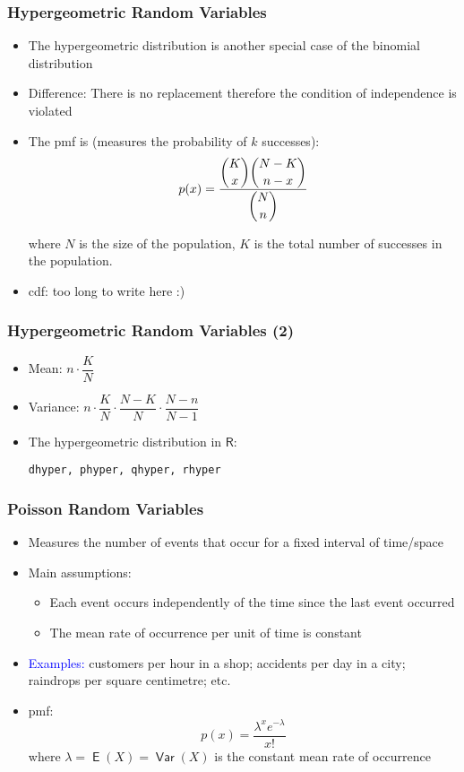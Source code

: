 \documentclass[10pt]{beamer}
\DeclareMathOperator{\E}{\mathsf{E}}
\DeclareMathOperator{\var}{\mathsf{Var}}
\theoremstyle{definition}
\begin{document}
\begin{frame}[fragile]
\frametitle{Hypergeometric Random Variables}
\begin{itemize}
	\item The hypergeometric distribution is another special case of the binomial distribution
		
	\item Difference: There is no replacement therefore the condition of independence is violated
		
	\item The pmf is (measures the probability of $ k $ successes):
	\[
		p(x) = \displaystyle\frac{\dbinom{K}{x}\dbinom{N-K}{n-x}}{\dbinom{N}{n}}
	\]
	
	where $N$ is the size of the population, $K$ is the total number of successes in the population.
	
	\item cdf: too long to write here :)
	\end{itemize}
\end{frame}

\begin{frame}[fragile]
\frametitle{Hypergeometric Random Variables (2)}
\begin{itemize}
	\item Mean: $ n\cdot\dfrac{K}{N} $
		
	\item Variance: $ n\cdot\dfrac{K}{N} \cdot \dfrac{N-K}{N}\cdot \dfrac{N - n}{N - 1}$
		
	\item The hypergeometric distribution in $\mathsf{R}$:
	\begin{lstlisting}[style = rstyle, breaklines]
	dhyper, phyper, qhyper, rhyper
	\end{lstlisting} 
\end{itemize}
\end{frame}

\begin{frame}[fragile]
\frametitle{Poisson Random Variables}
\begin{itemize}
	\item Measures the number of events that occur for a fixed interval of time/space
		
	\item Main assumptions:
	\begin{itemize}
		\item Each event occurs independently of the time since the last event occurred
			
		\item The mean rate of occurrence per unit of time is constant 
	\end{itemize}
		
	\item \textcolor{blue}{Examples:} customers per hour in a shop; accidents per day in a city; raindrops per square centimetre; etc.
		
	\item pmf:
	\[
		p(x) = \frac{\lambda^{x}e^{-\lambda}}{x!}
	\]
	where $\lambda = \E(X) = \var(X)$ is the constant mean rate of occurrence		
\end{itemize}
\end{frame}
\end{document}
